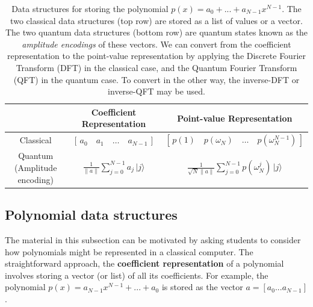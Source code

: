 \documentclass[prb,preprint]{revtex4}
\begin{document}
\begin{table}[h!]
	\centering
	\renewcommand{\arraystretch}{1.4} %
	\begin{tabular}{|c|c|c|}
		\hline
		\textbf{} & \textbf{Coefficient Representation} & \textbf{Point-value Representation} \\
		\hline
		Classical &
		$[\,a_0 \quad a_1 \quad \dots \quad a_{N-1}\,]$ &
		$[\,p(1) \quad p(\omega_N) \quad \dots \quad p(\omega_N^{N-1})\,]$ \\[1em]
		\hline
		Quantum (Amplitude encoding) &
		$\displaystyle \frac{1}{\|a\|} \sum_{j=0}^{N-1} a_j \, |j\rangle$ &
		$\displaystyle \frac{1}{\sqrt{N}\|a\|} \sum_{j=0}^{N-1} p(\omega_N^j) \, |j\rangle$ \\
		\hline
	\end{tabular}
	\caption{Data structures for storing the polynomial $p(x) = a_0 + ... + a_{N-1} x^{N-1}$. The two classical data structures (top row) are stored as a list of values or a vector. The two quantum data structures (bottom row) are quantum states known as the \textit{amplitude encodings} of these vectors. We can convert from the coefficient representation to the point-value representation by applying the Discrete Fourier Transform (DFT) in the classical case, and the Quantum Fourier Transform (QFT) in the quantum case. To convert in the other way, the inverse-DFT or inverse-QFT may be used.}
	\label{tbl:data_structures}
\end{table}

	\subsection{Polynomial data structures}	
	
	The material in this subsection can be motivated by asking students to consider how polynomials might be represented in a classical computer. 
	The straightforward approach, the \textbf{coefficient representation} of a polynomial \cite{cormen2009algorithms_ch30} involves storing a vector (or list) of all its coefficients. For example, the polynomial $p(x) = a_{N-1}x^{N-1} + ... + a_0$ is stored as the vector $a = [a_0 ... a_{N-1}]$. 
	
\end{document}
